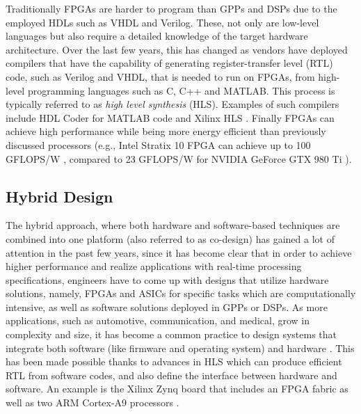 Traditionally FPGAs are harder to program than GPPs and DSPs due to the employed HDLs such as VHDL and Verilog. These, not only are low-level languages but also require a detailed knowledge of the target hardware architecture. Over the last few years, this has changed as vendors have deployed compilers that have the capability of generating register-transfer level (RTL) code, such as Verilog and VHDL, that is needed to run on FPGAs, from high-level programming languages such as C, C++ and MATLAB. This process is typically referred to as \emph{high level synthesis} (HLS). Examples of such compilers include HDL Coder \cite{unknown-l} for MATLAB code \cite{matlab-a} and Xilinx HLS \cite{unknown-m}. Finally FPGAs can achieve high performance while being more energy efficient than previously discussed processors \cite{choi2003a} (e.g., Intel Stratix 10 FPGA can achieve up to 100 GFLOPS/W \cite{altera2010a}, compared to 23 GFLOPS/W for NVIDIA GeForce GTX 980 Ti \cite{unknown-g}).

\subsection{Hybrid Design}

The hybrid approach, where both hardware and software-based techniques are combined into one platform (also referred to as co-design) has gained a lot of attention in the past few years, since it has become clear that in order to achieve higher performance and realize applications with real-time processing specifications, engineers have to come up with designs that utilize hardware solutions, namely, FPGAs and ASICs \cite{wolf2003a} \cite{micheli2001a} for specific tasks which are computationally intensive, as well as software solutions deployed in GPPs or DSPs. As more applications, such as automotive, communication, and medical, grow in complexity and size, it has become a common practice to design systems that integrate both software (like firmware and operating system) and hardware \cite{teich2012a}. This has been made possible thanks to advances in HLS which can produce efficient RTL from software codes, and also define the interface between hardware and software. An example is the Xilinx Zynq board \cite{unknown-k} that includes an FPGA fabric as well as two ARM Cortex-A9 processors \cite{unknown-p}.

